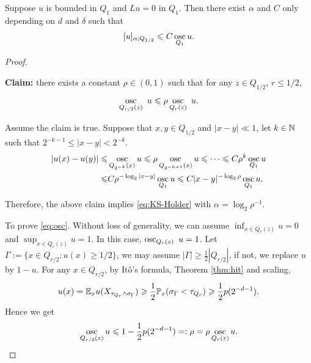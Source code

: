 	\begin{theorem}\label{thm:holder}
	  Suppose $u$ is bounded in $Q_1$ and $
	  Lu =0$ in $Q_1$. Then there exist $\alpha$ and $C$ only depending on $d$ and $\delta$ such that
	  \begin{equation}\label{eq:KS-Holder}
	      [u]_{\alpha; Q_{1/2}}\leqslant C \mathop{{\rm osc}}_{Q_1} u.
	  \end{equation} \end{theorem}
	\begin{proof}
  \begin{framed}
      {\bf Claim:} there exists a constant $\rho\in (0,1)$ such that  for any $z\in Q_{1/2}$, $r\leq 1/2$, 
		\begin{equation}\label{eq:osc}
		\mathop{{\rm osc}}_{Q_{r/2}(z)} \ u\leqslant \rho \mathop{{\rm osc}}_{Q_{r}(z)} \ u. 
		\end{equation}
  \end{framed}
        Assume the claim is true. Suppose that $x,y\in Q_{1/2}$  and $|x-y|\ll1$, let $k\in {\mathbb N}$ such that $2^{-k-1}\leq |x-y|< 2^{-k}$. 
        \begin{align*}
            |u(x)-u(y)|\leqslant& \mathop{{\rm osc}}_{Q_{2^{-k}}(x)} u \leqslant \rho \mathop{{\rm osc}}_{Q_{2^{-k+1}}(x)} u \leqslant \cdots \leqslant C\rho^k \mathop{{\rm osc}}_{Q_1} u\\
            \leqslant& C \rho^{-\log_2 |x-y|} \mathop{{\rm osc}}_{Q_1} u \leqslant C |x-y|^{-\log_2\rho} \mathop{{\rm osc}}_{Q_1} u. 
        \end{align*}
        
        Therefore, the above claim implies \eqref{eq:KS-Holder} with $\alpha=\log_2\rho^{-1}$. 
		
  To prove \eqref{eq:osc}. Without loss of generality, we can assume $\inf_{x\in Q_r(z)}u=0$ and $\sup_{x\in Q_r(z)} u=1$. In this case, $\mathop{{\rm osc}}_{Q_{r}(z)} \ u=1$. 
		Let $\Gamma:=\{x\in Q_{r/2}: u(x)\geq 1/2\}$, we may assume $|\Gamma|\geq \frac{1}{2} |Q_{r/2}|$, if not, we replace $u$ by $1-u$. For any $x\in Q_{r/2}$, by  Itô's formula, Theorem \ref{thm:hit} and scaling,  
		\[
            u(x)={\mathbb E}_x u(X_{\tau_{Q_r}\wedge \sigma_\Gamma})\geqslant \frac{1}{2}{\mathbb P}_x (\sigma_\Gamma<\tau_{Q_{r}})\geqslant \frac{1}{2} p(2^{-d-1}). 
        \]
        Hence we get 
		$$
		\mathop{{\rm osc}}_{Q_{r/2}(z)} u \leqslant 1-\frac{1}{2}p(2^{-d-1})=:\rho=\rho \mathop{{\rm osc}}_{Q_{r}(z)}u. 
		$$
	\end{proof}
	
	
	
